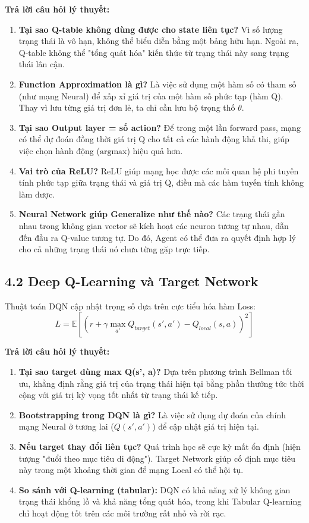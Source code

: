 \textbf{Trả lời câu hỏi lý thuyết:}
\begin{enumerate}
    \item \textbf{Tại sao Q-table không dùng được cho state liên tục?} Vì số lượng trạng thái là vô hạn, không thể biểu diễn bằng một bảng hữu hạn. Ngoài ra, Q-table không thể "tổng quát hóa" kiến thức từ trạng thái này sang trạng thái lân cận.
    \item \textbf{Function Approximation là gì?} Là việc sử dụng một hàm số có tham số (như mạng Neural) để xấp xỉ giá trị của một hàm số phức tạp (hàm Q). Thay vì lưu từng giá trị đơn lẻ, ta chỉ cần lưu bộ trọng thố $\theta$.
    \item \textbf{Tại sao Output layer = số action?} Để trong một lần forward pass, mạng có thể dự đoán đồng thời giá trị Q cho tất cả các hành động khả thi, giúp việc chọn hành động ($\text{argmax}$) hiệu quả hơn.
    \item \textbf{Vai trò của ReLU?} ReLU giúp mạng học được các mối quan hệ phi tuyến tính phức tạp giữa trạng thái và giá trị Q, điều mà các hàm tuyến tính không làm được.
    \item \textbf{Neural Network giúp Generalize như thế nào?} Các trạng thái gần nhau trong không gian vector sẽ kích hoạt các neuron tương tự nhau, dẫn đến đầu ra Q-value tương tự. Do đó, Agent có thể đưa ra quyết định hợp lý cho cả những trạng thái nó chưa từng gặp trực tiếp.
\end{enumerate}

\subsection{4.2 Deep Q-Learning và Target Network}
Thuật toán DQN cập nhật trọng số dựa trên cực tiểu hóa hàm Loss:
\begin{equation}
    L = \mathbb{E} \left[ (r + \gamma \max_{a'} Q_{target}(s', a') - Q_{local}(s, a))^2 \right]
\end{equation}

\textbf{Trả lời câu hỏi lý thuyết:}
\begin{enumerate}
    \item \textbf{Tại sao target dùng max Q(s', a)?} Dựa trên phương trình Bellman tối ưu, khẳng định rằng giá trị của trạng thái hiện tại bằng phần thưởng tức thời cộng với giá trị kỳ vọng tốt nhất từ trạng thái kế tiếp.
    \item \textbf{Bootstrapping trong DQN là gì?} Là việc sử dụng dự đoán của chính mạng Neural ở tương lai ($Q(s', a')$) để cập nhật giá trị hiện tại.
    \item \textbf{Nếu target thay đổi liên tục?} Quá trình học sẽ cực kỳ mất ổn định (hiện tượng "đuổi theo mục tiêu di động"). Target Network giúp cố định mục tiêu này trong một khoảng thời gian để mạng Local có thể hội tụ.
    \item \textbf{So sánh với Q-learning (tabular):} DQN có khả năng xử lý không gian trạng thái khổng lồ và khả năng tổng quát hóa, trong khi Tabular Q-learning chỉ hoạt động tốt trên các môi trường rất nhỏ và rời rạc.
\end{enumerate}

